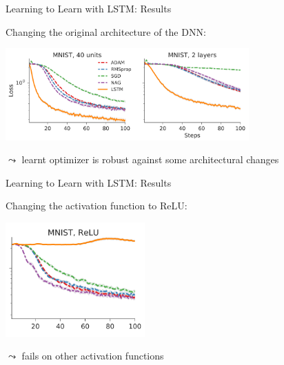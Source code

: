 \begin{frame}[c]{Learning to Learn with LSTM: Results }

Changing the original architecture of the DNN:
\smallskip

\centering
\includegraphics[width=0.7\textwidth]{images/l2l_mnist_okchange}

$\leadsto$ learnt optimizer is robust against some architectural changes

\end{frame}
\begin{frame}[c]{Learning to Learn with LSTM: Results }

Changing the activation function to ReLU:
\smallskip

\centering
\includegraphics[width=0.4\textwidth]{images/l2l_mnist_relu}

$\leadsto$ fails on other activation functions

\end{frame}
